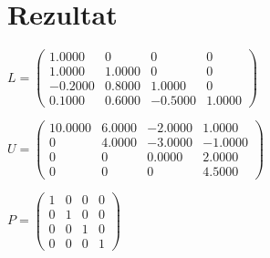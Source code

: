\documentclass{article}
\begin{document}
\section*{Rezultat}
\begin{center}
$
L =\begin{pmatrix}

    1.0000  &       0  &       0  &       0\\
    1.0000  &  1.0000  &       0  &       0\\
    -0.2000  &  0.8000  &  1.0000  &       0\\
    0.1000  &  0.6000  &  -0.5000  &  1.0000
\end{pmatrix}
$
\end{center}

\begin{center}
$
U =\begin{pmatrix}
  10.0000  &  6.0000  &  -2.0000  &  1.0000\\
    0  &  4.0000 & -3.0000 &  -1.0000\\
    0  & 0  &  0.0000  & 2.0000\\
    0  & 0  &  0  &  4.5000
\end{pmatrix}
$
\end{center} 

\begin{center}
$
P =\begin{pmatrix}
  1  &   0  &   0   & 0\\
  0  &   1  &   0   &  0\\
  0  &   0  &   1   &  0\\
  0  &   0  &   0   &  1
\end{pmatrix}
$
\end{center}
\end{document}

